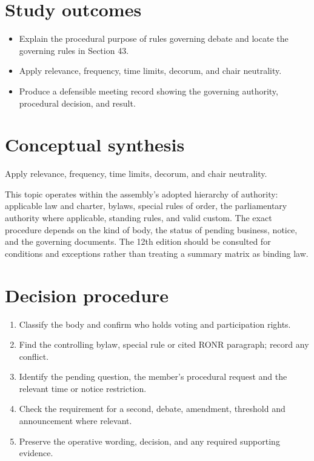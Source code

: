 \documentclass[11pt]{article}
\begin{document}
\SuiteOpen
{}
\section{Study outcomes}
\begin{itemize}[leftmargin=*,itemsep=4pt]
\item Explain the procedural purpose of rules governing debate and locate the governing rules in Section 43.
\item Apply relevance, frequency, time limits, decorum, and chair neutrality.
\item Produce a defensible meeting record showing the governing authority, procedural decision, and result.
\end{itemize}

\section{Conceptual synthesis}
Apply relevance, frequency, time limits, decorum, and chair neutrality.

This topic operates within the assembly’s adopted hierarchy of authority: applicable law and charter, bylaws, special rules of order, the parliamentary authority where applicable, standing rules, and valid custom. The exact procedure depends on the kind of body, the status of pending business, notice, and the governing documents. The 12th edition should be consulted for conditions and exceptions rather than treating a summary matrix as binding law.
\section{Decision procedure}
\begin{enumerate}[leftmargin=*,itemsep=4pt]
\item Classify the body and confirm who holds voting and participation rights.
\item Find the controlling bylaw, special rule or cited RONR paragraph; record any conflict.
\item Identify the pending question, the member’s procedural request and the relevant time or notice restriction.
\item Check the requirement for a second, debate, amendment, threshold and announcement where relevant.
\item Preserve the operative wording, decision, and any required supporting evidence.
\end{enumerate}
\end{document}
